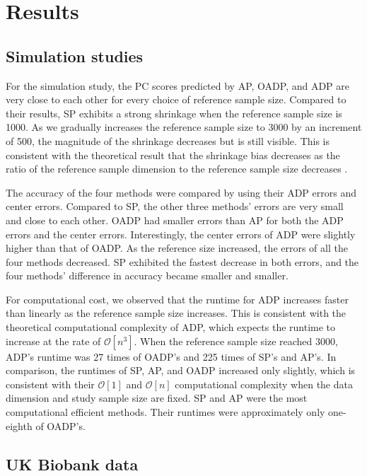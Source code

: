 \documentclass{article}
\newcommand{\bO}{\mathcal{O}}
\begin{document}
\section{Results}

\subsection{Simulation studies}

For the simulation study,
the PC scores predicted by AP, OADP, and ADP
are very close to each other
for every choice of reference sample size.
Compared to their results,
SP exhibits a strong shrinkage
when the reference sample size is 1000.
As we gradually increases the reference sample size to 3000
by an increment of 500,
the magnitude of the shrinkage decreases
but is still visible.
This is consistent with the theoretical result
that the shrinkage bias decreases
as the ratio of
the reference sample dimension to the reference sample size
decreases \citep{dey2016asymptotic}.

The accuracy of the four methods were compared
by using their ADP errors and center errors.
Compared to SP,
the other three methods' errors are very small
and close to each other.
OADP had smaller errors than AP
for both the ADP errors and the center errors.
Interestingly, the center errors of ADP were slightly higher
than that of OADP.
As the reference size increased,
the errors of all the four methods decreased.
SP exhibited the fastest decrease in both errors,
and the four methods' difference in accuracy
became smaller and smaller.

For computational cost,
we observed that the runtime for ADP increases faster than linearly
as the reference sample size increases.
This is consistent
with the theoretical computational complexity of ADP,
which expects the runtime to increase at the rate of $\bO[n^3]$.
When the reference sample size reached 3000,
ADP's runtime was 27 times of OADP's
and 225 times of SP's and AP's.
In comparison, the runtimes of SP, AP, and OADP
increased only slightly,
which is consistent with their $\bO[1]$ and $\bO[n]$ computational complexity when the data dimension and study sample size are fixed.
SP and AP were the most computational efficient methods.
Their runtimes were approximately only one-eighth of OADP's.

\subsection{UK Biobank data}
\end{document}
